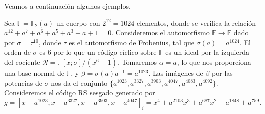 Veamos a continuación algunos ejemplos.

\begin{example}
  Sea \(\mathbb F = \mathbb F_2(a)\) un cuerpo con \(2^{12} = 1024\) elementos, donde se verifica la relación \(a^{12} + a^7 + a^{6} + a^{5} + a^{3} + a + 1 = 0\).
  Consideremos el automorfismo \(\mathbb F \to \mathbb F\) dado por \(\sigma = \tau^{10}\), donde \(\tau\) es el automorfismo de Frobenius, tal que \(\sigma(a) = a^{1024}\).
  El orden de \(\sigma\) es \(6\) por lo que un código cíclico sobre \(\mathbb F\) es un ideal por la izquierda del cociente \(\mathcal R = \mathbb F[x; \sigma]/(x^{6} - 1)\).
  Tomaremos \(\alpha = a\), lo que nos proporciona una base normal de \(\mathbb F\), y \(\beta = \sigma(a)a^{-1} = a^{1023}\).
  Las imágenes de \(\beta\) por las potencias de \(\sigma\) nos da el conjunto \(\{a^{1023}, a^{3327}, a^{3903}, a^{4047}, a^{4083}, a^{4092}\}\).
  Consideremos el código RS sesgado generado por
  \[
    g = \left[x - a^{1023}, x - a^{3327}, x - a^{3903}, x - a^{4047}\right]_i = x^4 + a^{2103}x^3 + a^{687}x^2 + a^{1848} + a^{759}.
  \]
\end{example}